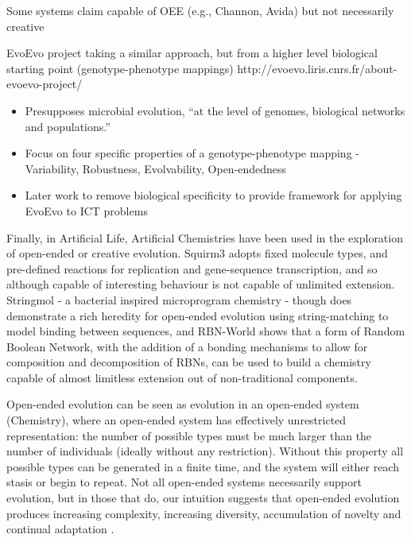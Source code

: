 Some systems claim capable of OEE (e.g., Channon, Avida) but not necessarily creative

EvoEvo project taking a similar approach, but from a higher level biological starting point (genotype-phenotype mappings)
http://evoevo.liris.cnrs.fr/about-evoevo-project/

\begin{itemize}
	\item Presupposes microbial evolution, ``at the level of genomes, biological networks and populations.''
	\item Focus on four specific properties of a genotype-phenotype mapping - Variability, Robustness, Evolvability, Open-endedness
	\item Later work to remove biological specificity to provide framework for applying EvoEvo to ICT problems
\end{itemize}

Finally, in Artificial Life, Artificial Chemistries have been used in the exploration of open-ended or creative evolution. Squirm3 \parencite{Hutton2002,Hutton2009,Lucht2012} adopts fixed molecule types, and pre-defined reactions for replication and gene-sequence transcription, and so although capable of interesting behaviour is not capable of unlimited extension. Stringmol \parencite{Hickinbotham2011} - a bacterial inspired microprogram chemistry - though does demonstrate a rich heredity for open-ended evolution using string-matching to model binding between sequences, and RBN-World \parencite{Faulconbridge2011} shows that a form of Random Boolean Network, with the addition of a bonding mechanisms to allow for composition and decomposition of RBNs, can be used to build a chemistry capable of almost limitless extension out of non-traditional components.

Open-ended evolution can be seen as evolution in an open-ended system (\eg Chemistry), where an open-ended system has effectively unrestricted representation: the number of possible types must be much larger than the number of individuals (ideally without any restriction). Without this property all possible types can be generated in a finite time, and the system will either reach stasis or begin to repeat. Not all open-ended systems necessarily support evolution, but in those that do, our intuition suggests that open-ended evolution produces increasing complexity, increasing diversity, accumulation of novelty and continual adaptation \cite{Lehman2012}.


